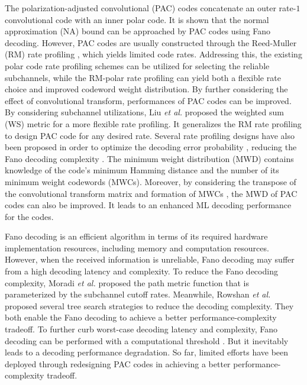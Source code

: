 \documentclass[12pt, draftclsnofoot, peerreview, onecolumn]{IEEEtran}
\theoremstyle{noparent}
\begin{document}
The polarization-adjusted convolutional (PAC) codes\cite{Arikan2019sequentialdecodingchannel}
concatenate an outer rate-$1$ convolutional code with an inner polar code. 
It is shown that the normal approximation (NA) bound can be approached by PAC codes using Fano decoding\cite{Arikan2019sequentialdecodingchannel}. 
However, PAC codes are usually constructed through the Reed-Muller (RM) rate profiling \cite{Arikan2019sequentialdecodingchannel}, 
which yields limited code rates. 
Addressing this, 
the existing polar code rate profiling schemes \cite{Arikan2009ChannelPolarizationMethod}\cite{Mori2009PerformancePolarCodes, Tal2013HowConstructPolar, Trifonov2012EfficientDesignDecoding, He2017BetaExpansionTheoretical} 
can be utilized for selecting the reliable subchannels, 
while the RM-polar rate profiling \cite{Li2014RMPolarCodes}\cite{Rowshan2021PolarizationAdjustedConvolutional} 
can yield both a flexible rate choice and improved codeword weight distribution. 
By further considering the effect of convolutional transform, 
performances of PAC codes can be improved. 
By considering subchannel utilizations, Liu {\em et al.} \cite{Liu2023} proposed the weighted sum (WS) metric for a more flexible rate profiling. 
It generalizes the RM rate profiling to design PAC code for any desired rate.
Several rate profiling designs have also been proposed in order to optimize
the decoding error probability \cite{Moradi2021MonteCarloBased}\cite{Chiu2023DesignPolarCodes}, 
reducing the Fano decoding complexity \cite{Moradi2024PACCodeRate}\cite{Jiang2023ConstructionPACCodes}.
The minimum weight distribution (MWD) contains knowledge of the code's minimum Hamming distance and 
the number of its minimum weight codewords (MWCs). 
Moreover, by considering the transpose of the convolutional transform matrix \cite{Gu2023ImprovedConvolutionalPrecoder} and 
formation of MWCs \cite{Rowshan2023FormationMinweight}, 
the MWD of PAC codes can also be improved. 
It leads to an enhanced ML decoding performance for the codes.



Fano decoding \cite{Fano1963heuristicdiscussionprobabilistic} is an efficient
algorithm in terms of its required hardware implementation resources, including memory and computation resources.
However, when the received information is unreliable, 
Fano decoding may suffer from a high decoding latency and complexity. 
To reduce the Fano decoding complexity, Moradi {\em et al.} \cite{Moradi2021SequentialDecodingMetric} 
proposed the path metric function that is parameterized by the subchannel cutoff rates.
Meanwhile, Rowshan {\em et al.} \cite{Rowshan2021PolarizationAdjustedConvolutional} 
proposed several tree search strategies to reduce the decoding complexity.
They both enable the Fano decoding to achieve a better performance-complexity tradeoff.
To further curb worst-case decoding latency and complexity, Fano decoding can be performed with a computational threshold \cite{Moradi2021SequentialDecodingMetric, Moradi2020PerformanceComplexitySequential, Liu2021HybridDecodingCRC}.
But it inevitably leads to a decoding performance degradation.
So far, limited efforts have been deployed through redesigning PAC codes in achieving a better performance-complexity tradeoff.
\end{document}
